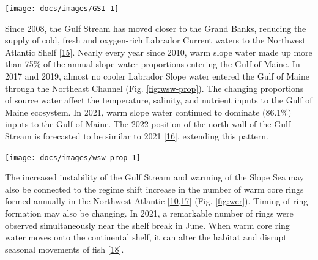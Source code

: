 \documentclass[
  10pt,
]{article}
\let\origfigure\figure
\let\endorigfigure\endfigure
\renewenvironment{figure}[1][2] {
    \expandafter\origfigure\expandafter[H]
} {
    \endorigfigure
}
\begin{document}
\begin{figure}

{\centering \texttt{[image: docs/images/GSI-1]} 

}

\caption{Index representing changes in the location of the Gulf Stream north wall. Positive values represent a more northerly Gulf Stream position.}\label{fig:GSI}
\end{figure}

Since 2008, the Gulf Stream has moved closer to the Grand Banks,
reducing the supply of cold, fresh and oxygen-rich Labrador Current
waters to the Northwest Atlantic Shelf
{[}\protect\hyperlink{ref-goncalves_neto_changes_2021}{15}{]}. Nearly
every year since 2010, warm slope water made up more than 75\% of the
annual slope water proportions entering the Gulf of Maine. In 2017 and
2019, almost no cooler Labrador Slope water entered the Gulf of Maine
through the Northeast Channel (Fig. \ref{fig:wsw-prop}). The changing
proportions of source water affect the temperature, salinity, and
nutrient inputs to the Gulf of Maine ecosystem. In 2021, warm slope
water continued to dominate (86.1\%) inputs to the Gulf of Maine. The
2022 position of the north wall of the Gulf Stream is forecasted to be
similar to 2021
{[}\protect\hyperlink{ref-silver_forecasting_2021}{16}{]}, extending
this pattern.

\begin{figure}

{\centering \texttt{[image: docs/images/wsw-prop-1]} 

}

\caption{Proportion of Warm Slope Water (WSW) and Labrador Slope Water (LSLW) entering the GOM through the Northeast Channel.}\label{fig:wsw-prop}
\end{figure}

The increased instability of the Gulf Stream and warming of the Slope
Sea may also be connected to the regime shift increase in the number of
warm core rings formed annually in the Northwest Atlantic
{[}\protect\hyperlink{ref-gangopadhyay_census_2020}{10},\protect\hyperlink{ref-gangopadhyay_observed_2019}{17}{]}
(Fig. \ref{fig:wcr}). Timing of ring formation may also be changing. In
2021, a remarkable number of rings were observed simultaneously near the
shelf break in June. When warm core ring water moves onto the
continental shelf, it can alter the habitat and disrupt seasonal
movements of fish
{[}\protect\hyperlink{ref-gawarkiewicz_changing_2018}{18}{]}.
\end{document}

